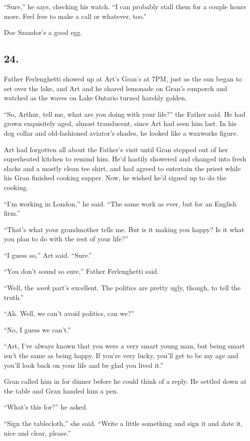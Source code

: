 “Sure,” he says, checking his watch. “I can probably stall them for
a couple hours more. Feel free to make a call or whatever, too.”

Doc Szandor’s a good egg.

\subsection{24.}

Father Ferlenghetti showed up at Art’s Gran’s at 7PM, just as the
sun began to set over the lake, and Art and he shared lemonade on
Gran’s sunporch and watched as the waves on Lake Ontario turned
harshly golden.

“So, Arthur, tell me, what are you doing with your life?” the
Father said. He had grown exquisitely aged, almost translucent,
since Art had seen him last. In his dog collar and old-fashioned
aviator’s shades, he looked like a waxworks figure.

Art had forgotten all about the Father’s visit until Gran stepped
out of her superheated kitchen to remind him. He’d hastily showered
and changed into fresh slacks and a mostly clean tee shirt, and had
agreed to entertain the priest while his Gran finished cooking
supper. Now, he wished he’d signed up to do the cooking.

“I’m working in London,” he said. “The same work as ever, but for
an English firm.”

“That’s what your grandmother tells me. But is it making you happy?
Is it what you plan to do with the rest of your life?”

“I guess so,” Art said. “Sure.”

“You don’t sound so sure,” Father Ferlenghetti said.

“Well, the \emph{work} part’s excellent. The politics are pretty
ugly, though, to tell the truth.”

“Ah. Well, we can’t avoid politics, can we?”

“No, I guess we can’t.”

“Art, I’ve always known that you were a very smart young man, but
being smart isn’t the same as being happy. If you’re very lucky,
you’ll get to be my age and you’ll look back on your life and be
glad you lived it.”

Gran called him in for dinner before he could think of a reply. He
settled down at the table and Gran handed him a pen.

“What’s this for?” he asked.

“Sign the tablecloth,” she said. “Write a little something and sign
it and date it, nice and clear, please.”

